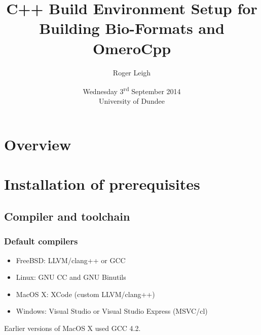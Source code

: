 \documentclass{beamer}
\title{C++ Build Environment Setup for Building Bio-Formats and OmeroCpp}
\author{Roger Leigh}
\date{Wednesday 3\textsuperscript{rd} September 2014\\University of Dundee}
\begin{document}
\begin{frame}[plain]
  \titlepage
  \begin{center}
     \hfill
    \hfill
  \end{center}
\end{frame}

\section[]{Overview}

\section{Installation of prerequisites}
\subsection{Compiler and toolchain}
\begin{frame}
  \frametitle{Default compilers}
  \begin{itemize}
  \item FreeBSD: LLVM/clang++ or GCC
  \item Linux: GNU CC and GNU Binutils
  \item MacOS X: XCode (custom LLVM/clang++)
  \item Windows: Visual Studio or Visual Studio Express (MSVC/cl)
  \end{itemize}

  Earlier versions of MacOS X used GCC 4.2.
\end{frame}
\end{document}
